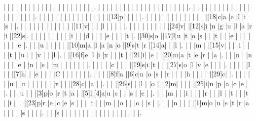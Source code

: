 \documentclass[12pt]{article}
\begin{document}
\begin{Puzzle}{22}{24}
  |{}  |{}  |{}  |{}  |{}  |{}  |{}  |{}  |{}  |{}  |{}  |{}  |{}  |{}  |{}  |{}  |{}  |{}  |{}  |{}  |{}  |.
  |{}  |{}  |{}  |{}  |{}  |{}  |{}  |{}  |{}  |{}  |{}  |{}  |{}  |{}  |{}  |{}  |{}  |{}  |{}  |{}  |{}  |.
  |{}  |{}  |{}  |{}  |{}  |{}  |{}  |{}  |{}  |{}  |{}  |{}  |{}  |{}  |{}  |{}  |{}  |{}  |{}  |{}  |{}  |.
  |{}  |{}  |{}  |{}  |{}  |{}  |{}  |{}  |{}  |{}  |{}  |{}  |{}  |{}  |{}  |{}  |[13]p|{}  |{}  |{}  |{}  |.
  |{}  |{}  |{}  |{}  |{}  |{}  |{}  |{}  |{}  |{}  |{}  |{}  |{}  |{}  |[18]c|a   |e   |l   |i   |s   |{}  |.
  |{}  |{}  |{}  |{}  |{}  |{}  |{}  |{}  |{}  |{}  |{}  |{}  |[11]v|{}  |{}  |{}  |l   |{}  |{}  |{}  |{}  |.
  |{}  |{}  |{}  |{}  |{}  |{}  |{}  |{}  |{}  |[24]v|{}  |[12]s|i   |n   |g   |u   |l   |a   |r   |i   |[22]s|.
  |{}  |{}  |{}  |{}  |{}  |{}  |{}  |{}  |{}  |i   |{}  |{}  |d   |{}  |{}  |{}  |e   |{}  |{}  |{}  |t   |.
  |[30]s|o   |[17]l|u   |t   |o   |s   |{}  |{}  |t   |{}  |{}  |e   |{}  |{}  |{}  |{}  |{}  |{}  |{}  |e   |.
  |{}  |{}  |u   |{}  |{}  |{}  |{}  |{}  |[10]m|a   |l   |a   |n   |o   |[9]s|t   |r   |[14]a|{}  |{}  |l   |.
  |{}  |{}  |m   |{}  |[15]v|{}  |{}  |{}  |i   |{}  |{}  |{}  |t   |{}  |u   |{}  |{}  |v   |{}  |{}  |l   |.
  |{}  |[16]f|e   |l   |i   |x   |{}  |{}  |t   |{}  |[21]i|{}  |e   |{}  |[20]m|a   |t   |e   |r   |{}  |a   |.
  |{}  |{}  |n   |{}  |n   |{}  |{}  |{}  |e   |{}  |n   |{}  |s   |{}  |m   |{}  |{}  |{}  |{}  |{}  |{}  |.
  |{}  |{}  |{}  |{}  |c   |{}  |{}  |{}  |[19]s|i   |t   |{}  |{}  |[27]s|o   |l   |v   |e   |{}  |{}  |{}  |.
  |{}  |{}  |{}  |{}  |l   |{}  |{}  |[7]h|{}  |{}  |e   |{}  |{}  |{}  |C   |{}  |{}  |{}  |{}  |{}  |{}  |.
  |{}  |{}  |{}  |[8]f|a   |[6]c|n   |o   |s   |{}  |r   |{}  |{}  |{}  |h   |{}  |{}  |{}  |{}  |[29]c|{}  |.
  |{}  |{}  |{}  |{}  |{}  |u   |{}  |n   |{}  |{}  |{}  |{}  |{}  |{}  |r   |{}  |{}  |[28]c|{}  |a   |{}  |.
  |{}  |{}  |[26]s|{}  |{}  |l   |{}  |o   |{}  |[2]m|{}  |{}  |{}  |{}  |[25]i|n   |p   |a   |c   |e   |{}  |.
  |{}  |{}  |u   |{}  |{}  |[3]p|o   |r   |t   |a   |{}  |[5]l|[4]a|u   |s   |{}  |{}  |s   |{}  |c   |{}  |.
  |{}  |{}  |m   |{}  |{}  |i   |{}  |{}  |{}  |r   |{}  |{}  |l   |{}  |t   |{}  |{}  |t   |{}  |i   |{}  |.
  |[23]p|r   |e   |c   |e   |s   |{}  |{}  |{}  |i   |{}  |{}  |m   |{}  |o   |{}  |{}  |o   |{}  |s   |{}  |.
  |{}  |{}  |n   |{}  |{}  |{}  |[1]m|o   |n   |s   |t   |r   |a   |{}  |{}  |{}  |{}  |s   |{}  |{}  |{}  |.
  |{}  |{}  |s   |{}  |{}  |{}  |{}  |{}  |{}  |{}  |{}  |{}  |{}  |{}  |{}  |{}  |{}  |{}  |{}  |{}  |{}  |.
\end{Puzzle}
\end{document}
